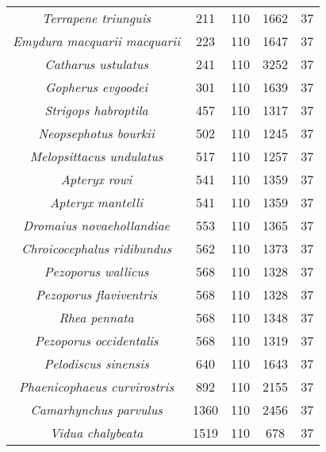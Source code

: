 \begin{longtable}[c]{|c|c|c|c|c|}
\textit{Terrapene triunguis}          & 211  & 110 & 1662 & 37 \\
\textit{Emydura macquarii macquarii}  & 223  & 110 & 1647 & 37 \\
\textit{Catharus ustulatus}           & 241  & 110 & 3252 & 37 \\
\textit{Gopherus evgoodei}            & 301  & 110 & 1639 & 37 \\
\textit{Strigops habroptila}          & 457  & 110 & 1317 & 37 \\
\textit{Neopsephotus bourkii}         & 502  & 110 & 1245 & 37 \\
\textit{Melopsittacus undulatus}      & 517  & 110 & 1257 & 37 \\
\textit{Apteryx rowi}                 & 541  & 110 & 1359 & 37 \\
\textit{Apteryx mantelli}             & 541  & 110 & 1359 & 37 \\
\textit{Dromaius novaehollandiae}     & 553  & 110 & 1365 & 37 \\
\textit{Chroicocephalus ridibundus}   & 562  & 110 & 1373 & 37 \\
\textit{Pezoporus wallicus}           & 568  & 110 & 1328 & 37 \\
\textit{Pezoporus flaviventris}       & 568  & 110 & 1328 & 37 \\
\textit{Rhea pennata}                 & 568  & 110 & 1348 & 37 \\
\textit{Pezoporus occidentalis}       & 568  & 110 & 1319 & 37 \\
\textit{Pelodiscus sinensis}          & 640  & 110 & 1643 & 37 \\
\textit{Phaenicophaeus curvirostris}  & 892  & 110 & 2155 & 37 \\
\textit{Camarhynchus parvulus}        & 1360 & 110 & 2456 & 37 \\
\textit{Vidua chalybeata}             & 1519 & 110 & 678  & 37 \\ \hline
\end{longtable}


